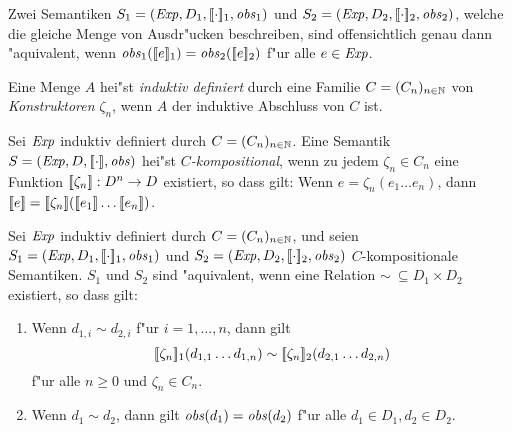 \documentclass[12pt,a4paper]{article}
\begin{document}
\begin{lemma}
  Zwei Semantiken $S_1=(\mathit{Exp},D_1,[\![\cdot]\!]_1,\mathit{obs}_1)$ und $S_2=(\mathit{Exp},D_2,[\![\cdot]\!]_2,\mathit{obs}_2)$,
  welche die gleiche Menge von Ausdr"ucken beschreiben, sind offensichtlich genau dann "aquivalent, wenn
  $\mathit{obs}_1([\![e]\!]_1)=\mathit{obs}_2([\![e]\!]_2)$ f"ur alle $e \in \mathit{Exp}$.
\end{lemma}

\begin{definition}
  Eine Menge $A$ hei"st \emph{induktiv definiert} durch eine Familie $C = (C_n)_{n\in\mathbb N}$ von
  \emph{Konstruktoren} $\zeta_n$, wenn $A$ der induktive Abschluss von $C$ ist.
\end{definition}

\begin{definition}[Kompositionalit"at]
  Sei $\mathit{Exp}$ induktiv definiert durch $C=(C_n)_{n\in\mathbb N}$.
  Eine Semantik $S=(\mathit{Exp},D,[\![\cdot]\!],\mathit{obs})$ hei"st \emph{$C$-kompositional},
  wenn zu jedem $\zeta_n \in C_n$ eine Funktion $[\![\zeta_n]\!]: D^n \to D$ existiert, so dass gilt:
  Wenn $e = \zeta_n (e_1 \ldots e_n)$, dann 
  $\semantic{e} = \semantic{\zeta_n}(\semantic{e_1} \ldots \semantic{e_n})$.
\end{definition}

\begin{theorem}
  Sei $\mathit{Exp}$ induktiv definiert durch $C=(C_n)_{n\in\mathbb N}$, und seien \linebreak
  $S_1 = (\mathit{Exp},D_1,[\![\cdot]\!]_1,\mathit{obs}_1)$ und $S_2 = (\mathit{Exp},D_2,[\![\cdot]\!]_2,\mathit{obs}_2)$
  $C$-kompositionale Semantiken. $S_1$ und $S_2$ sind "aquivalent, wenn eine Relation
  $\sim\ \subseteq D_1 \times D_2$ existiert, so dass gilt:
  \begin{enumerate}
  \item Wenn $d_{1,i} \sim d_{2,i}$ f"ur $i=1,\ldots,n$, dann gilt
    \[[\![\zeta_n]\!]_1 (d_{1,1} \ldots d_{1,n}) \sim [\![\zeta_n]\!]_2 (d_{2,1} \ldots d_{2,n})\]
    f"ur alle $n \ge 0$ und $\zeta_n \in C_n$.
  \item Wenn $d_1 \sim d_2$, dann gilt $\mathit{obs}(d_1) = \mathit{obs}(d_2)$ f"ur alle $d_1 \in D_1, d_2 \in D_2$.
  \end{enumerate}
\end{theorem}
\end{document}
